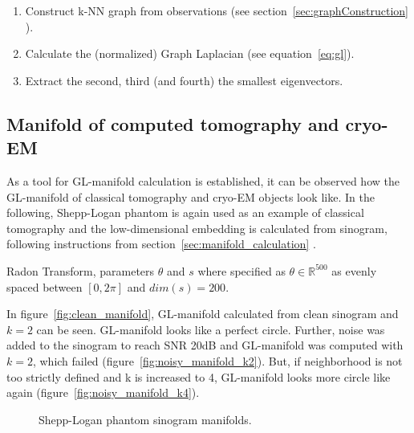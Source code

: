 \begin{enumerate}
    \item Construct k-NN graph from observations (see section~\ref{sec:graphConstruction} \textit{}).
    \item Calculate the (normalized) Graph Laplacian (see equation~\ref{eq:gl}).
    \item Extract the second, third (and fourth) the smallest eigenvectors.
\end{enumerate}

\subsection{Manifold of computed tomography and cryo-EM}
As a tool for GL-manifold calculation is established, it can be observed how the GL-manifold of classical tomography and cryo-EM objects look like.
In the following, Shepp-Logan phantom is again used as an example of classical tomography
and the low-dimensional embedding is calculated from sinogram, following instructions from 
section~\ref{sec:manifold_calculation} \textit{}.

Radon Transform, parameters $\theta$ and $s$ where specified as $\theta \in \mathbb{R}^{500}$ as evenly spaced
between $[0, 2 \pi]$ and $dim(s) = 200$. 

In figure~\ref{fig:clean_manifold}, GL-manifold calculated from clean sinogram and $k=2$ can be seen.
GL-manifold looks like a perfect circle. Further, noise was added to the sinogram 
to reach SNR 20dB and GL-manifold was computed with $k=2$, which failed (figure~\ref{fig:noisy_manifold_k2}).
But, if neighborhood is not too strictly defined and k is increased to 4, GL-manifold looks more circle like again
(figure~\ref{fig:noisy_manifold_k4}).

\begin{figure}[H]
    \centering
    \hfill
        \hfill
    \hfill
    \hfill
    \caption{Shepp-Logan phantom sinogram manifolds.}
\end{figure}

